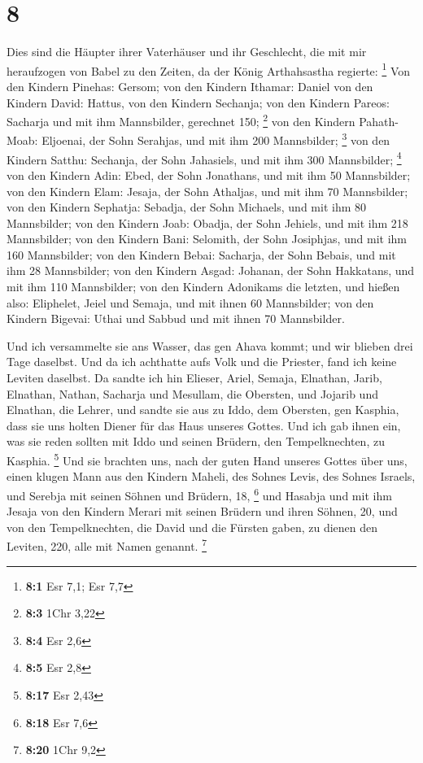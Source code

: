 \hypertarget{section-1}{%
\section{8}\label{section-1}}

 Dies sind die Häupter ihrer Vaterhäuser und ihr
Geschlecht, die mit mir heraufzogen von Babel zu den Zeiten, da der
König Arthahsastha regierte: \footnote{\textbf{8:1} Esr 7,1; Esr 7,7}
 Von den Kindern Pinehas: Gersom; von den Kindern Ithamar:
Daniel von den Kindern David: Hattus,  von den Kindern
Sechanja; von den Kindern Pareos: Sacharja und mit ihm Mannsbilder,
gerechnet 150; \footnote{\textbf{8:3} 1Chr 3,22}  von den
Kindern Pahath-Moab: Eljoenai, der Sohn Serahjas, und mit ihm 200
Mannsbilder; \footnote{\textbf{8:4} Esr 2,6}  von den
Kindern Satthu: Sechanja, der Sohn Jahasiels, und mit ihm 300
Mannsbilder; \footnote{\textbf{8:5} Esr 2,8}  von den
Kindern Adin: Ebed, der Sohn Jonathans, und mit ihm 50 Mannsbilder;
 von den Kindern Elam: Jesaja, der Sohn Athaljas, und mit
ihm 70 Mannsbilder;  von den Kindern Sephatja: Sebadja,
der Sohn Michaels, und mit ihm 80 Mannsbilder;  von den
Kindern Joab: Obadja, der Sohn Jehiels, und mit ihm 218 Mannsbilder;
 von den Kindern Bani: Selomith, der Sohn Josiphjas, und
mit ihm 160 Mannsbilder;  von den Kindern Bebai:
Sacharja, der Sohn Bebais, und mit ihm 28 Mannsbilder; 
von den Kindern Asgad: Johanan, der Sohn Hakkatans, und mit ihm 110
Mannsbilder;  von den Kindern Adonikams die letzten, und
hießen also: Eliphelet, Jeiel und Semaja, und mit ihnen 60 Mannsbilder;
 von den Kindern Bigevai: Uthai und Sabbud und mit ihnen
70 Mannsbilder.

 Und ich versammelte sie ans Wasser, das gen Ahava kommt;
und wir blieben drei Tage daselbst. Und da ich achthatte aufs Volk und
die Priester, fand ich keine Leviten daselbst.  Da sandte
ich hin Elieser, Ariel, Semaja, Elnathan, Jarib, Elnathan, Nathan,
Sacharja und Mesullam, die Obersten, und Jojarib und Elnathan, die
Lehrer,  und sandte sie aus zu Iddo, dem Obersten, gen
Kasphia, dass sie uns holten Diener für das Haus unseres Gottes. Und ich
gab ihnen ein, was sie reden sollten mit Iddo und seinen Brüdern, den
Tempelknechten, zu Kasphia. \footnote{\textbf{8:17} Esr 2,43}
 Und sie brachten uns, nach der guten Hand unseres Gottes
über uns, einen klugen Mann aus den Kindern Maheli, des Sohnes Levis,
des Sohnes Israels, und Serebja mit seinen Söhnen und Brüdern, 18,
\footnote{\textbf{8:18} Esr 7,6}  und Hasabja und mit ihm
Jesaja von den Kindern Merari mit seinen Brüdern und ihren Söhnen, 20,
 und von den Tempelknechten, die David und die Fürsten
gaben, zu dienen den Leviten, 220, alle mit Namen genannt. \footnote{\textbf{8:20}
  1Chr 9,2}

